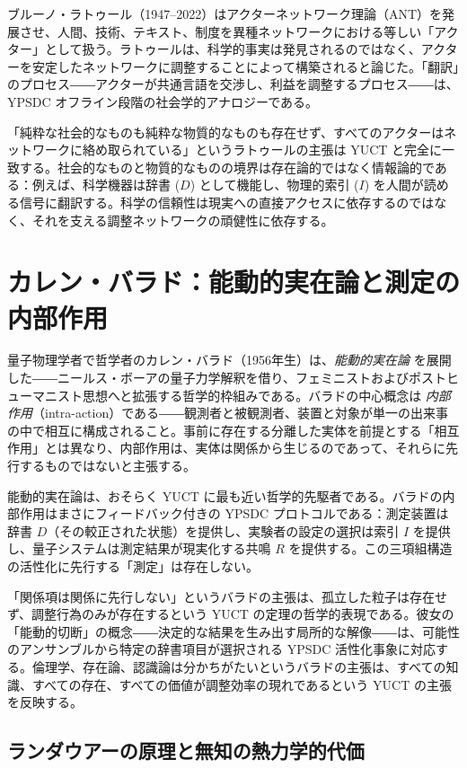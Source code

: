 \documentclass[12pt,a4paper]{article}
\begin{document}
	ブルーノ・ラトゥール（1947–2022）はアクターネットワーク理論（ANT）を発展させ、人間、技術、テキスト、制度を異種ネットワークにおける等しい「アクター」として扱う。ラトゥールは、科学的事実は発見されるのではなく、アクターを安定したネットワークに調整することによって構築されると論じた。「翻訳」のプロセス――アクターが共通言語を交渉し、利益を調整するプロセス――は、YPSDC オフライン段階の社会学的アナロジーである。
	
	「純粋な社会的なものも純粋な物質的なものも存在せず、すべてのアクターはネットワークに絡め取られている」というラトゥールの主張は YUCT と完全に一致する。社会的なものと物質的なものの境界は存在論的ではなく情報論的である：例えば、科学機器は辞書 (\(D\)) として機能し、物理的索引 (\(I\)) を人間が読める信号に翻訳する。科学の信頼性は現実への直接アクセスに依存するのではなく、それを支える調整ネットワークの頑健性に依存する。
	
	\section{カレン・バラド：能動的実在論と測定の内部作用}
	
	量子物理学者で哲学者のカレン・バラド（1956年生）は、\emph{能動的実在論} を展開した――ニールス・ボーアの量子力学解釈を借り、フェミニストおよびポストヒューマニスト思想へと拡張する哲学的枠組みである。バラドの中心概念は \emph{内部作用}（intra-action）である――観測者と被観測者、装置と対象が単一の出来事の中で相互に構成されること。事前に存在する分離した実体を前提とする「相互作用」とは異なり、内部作用は、実体は関係から生じるのであって、それらに先行するものではないと主張する。
	
	能動的実在論は、おそらく YUCT に最も近い哲学的先駆者である。バラドの内部作用はまさにフィードバック付きの YPSDC プロトコルである：測定装置は辞書 \(D\)（その較正された状態）を提供し、実験者の設定の選択は索引 \(I\) を提供し、量子システムは測定結果が現実化する共鳴 \(R\) を提供する。この三項組構造の活性化に先行する「測定」は存在しない。
	
	「関係項は関係に先行しない」というバラドの主張は、孤立した粒子は存在せず、調整行為のみが存在するという YUCT の定理の哲学的表現である。彼女の「能動的切断」の概念――決定的な結果を生み出す局所的な解像――は、可能性のアンサンブルから特定の辞書項目が選択される YPSDC 活性化事象に対応する。倫理学、存在論、認識論は分かちがたいというバラドの主張は、すべての知識、すべての存在、すべての価値が調整効率の現れであるという YUCT の主張を反映する。
	
	\subsection{ランダウアーの原理と無知の熱力学的代価}
	
\end{document}
